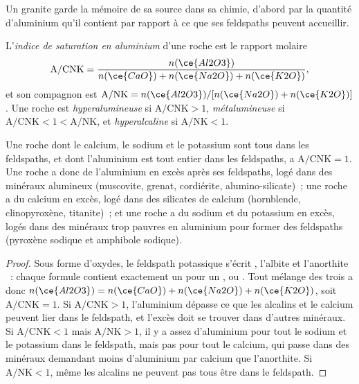 Un granite garde la mémoire de sa source dans sa chimie, d'abord par la quantité d'aluminium
qu'il contient par rapport à ce que ses feldspaths peuvent accueillir.

\begin{definition}\label{def:b2:crustal-melting:asi}
L'\emph{indice de saturation en aluminium} d'une roche est le
rapport molaire
\[\mathrm{A/CNK} = \frac{n(\ce{Al2O3})}{n(\ce{CaO}) + n(\ce{Na2O}) + n(\ce{K2O})},\]
et son compagnon est $\mathrm{A/NK} = n(\ce{Al2O3})/[n(\ce{Na2O}) + n(\ce{K2O})]$. Une roche
est \emph{hyperalumineuse} si $\mathrm{A/CNK} > 1$,
\emph{métalumineuse} si $\mathrm{A/CNK} < 1 < \mathrm{A/NK}$, et
\emph{hyperalcaline} si $\mathrm{A/NK} < 1$.
\end{definition}

\begin{proposition}\label{prop:b2:crustal-melting:feldspar}
Une roche dont le calcium, le sodium et le potassium sont tous dans les feldspaths,
et dont l'aluminium est tout entier dans les feldspaths, a $\mathrm{A/CNK} = 1$.
Une roche  a donc de l'aluminium en excès après ses feldspaths,
logé dans des minéraux alumineux (muscovite, grenat, cordiérite, alumino-silicate)~; une roche  a du calcium en excès,
logé dans des silicates de calcium (hornblende, clinopyroxène, titanite)~; et une roche 
a du sodium et du potassium en excès, logés dans des minéraux trop pauvres en aluminium pour former des feldspaths
(pyroxène sodique et amphibole sodique).
\end{proposition}

\begin{proof}
Sous forme d'oxydes, le feldspath potassique s'écrit , l'albite  et
l'anorthite ~: chaque formule contient exactement un  pour un ,  ou .
Tout mélange des trois a donc $n(\ce{Al2O3}) =
n(\ce{CaO}) + n(\ce{Na2O}) + n(\ce{K2O})$, soit $\mathrm{A/CNK} = 1$. Si
$\mathrm{A/CNK} > 1$, l'aluminium dépasse ce que les alcalins et le calcium peuvent lier dans le feldspath,
et l'excès doit se trouver dans d'autres minéraux. Si $\mathrm{A/CNK} < 1$ mais
$\mathrm{A/NK} > 1$, il y a assez d'aluminium pour tout le sodium et le potassium dans le feldspath,
mais pas pour tout le calcium, qui passe dans des minéraux
demandant moins d'aluminium par calcium que l'anorthite. Si $\mathrm{A/NK} < 1$, même les alcalins
ne peuvent pas tous être dans le feldspath.
\end{proof}

